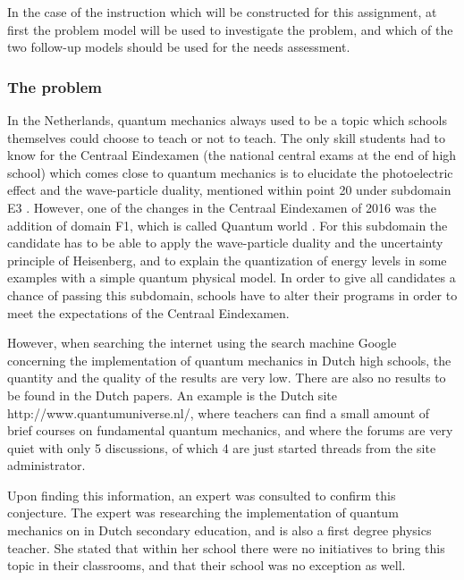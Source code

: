 \documentclass[11pt,twoside]{report} %
\begin{document}
In the case of the instruction which will be constructed for this assignment, at first the problem model will be used to investigate the problem, and which of the two follow-up models should be used for the needs assessment.

\subsubsection{The problem}
\label{sssec:problem}

In the Netherlands, quantum mechanics always used to be a topic which schools themselves could choose to teach or not to teach. The only skill students had to know for the Centraal Eindexamen (the national central exams at the end of high school) which comes close to quantum mechanics is to elucidate the photoelectric effect and the wave-particle duality, mentioned within point 20 under subdomain E3 \cite{eindexamen2015}. However, one of the changes in the Centraal Eindexamen of 2016 was the addition of domain F1, which is called Quantum world \cite{eindexamen2016}. For this subdomain the candidate has to be able to apply the wave-particle duality and the uncertainty principle of Heisenberg, and to explain the quantization of energy levels in some examples with a simple quantum physical model. In order to give all candidates a chance of passing this subdomain, schools have to alter their programs in order to meet the expectations of the Centraal Eindexamen.

However, when searching the internet using the search machine Google concerning the implementation of quantum mechanics in Dutch high schools, the quantity and the quality of the results are very low. There are also no results to be found in the Dutch papers. An example is the Dutch site http://www.quantumuniverse.nl/, where teachers can find a small amount of brief courses on fundamental quantum mechanics, and where the forums are very quiet with only 5 discussions, of which 4 are just started threads from the site administrator.

Upon finding this information, an expert was consulted to confirm this conjecture. The expert was researching the implementation of quantum mechanics on in Dutch secondary education, and is also a first degree physics teacher. She stated that within her school there were no initiatives to bring this topic in their classrooms, and that their school was no exception as well.
\end{document}
